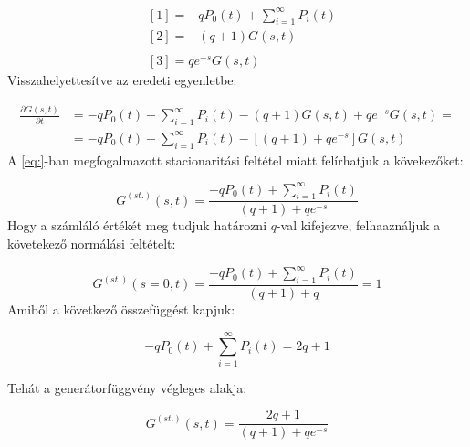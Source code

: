 \begin{align}
    &[1] = - q P_{0} \left( t \right)
    +
    \sum_{i=1}^{\infty} P_{i} \left( t \right)
    \\
    &[2] = - \left( q + 1 \right) G \left( s, t \right)
    \\ \nonumber \\
    &[3] = q e^{-s} G \left( s, t \right)
\end{align}
Visszahelyettesítve az eredeti egyenletbe:

\begin{align}
    \frac{\partial G \left( s, t \right)}{\partial t}
    &=
    - q P_{0} \left( t \right)
    +
    \sum_{i=1}^{\infty} P_{i} \left( t \right)
    -
    \left( q + 1 \right) G \left( s, t \right)
    +
    q e^{-s} G \left( s, t \right)
    = \nonumber \\
    &=
    - q P_{0} \left( t \right)
    +
    \sum_{i=1}^{\infty} P_{i} \left( t \right)
    -
    \left[ \left( q + 1 \right)
    +
    q e^{-s} \right] G \left( s, t \right)
\end{align}
A \ref{eq:}-ban megfogalmazott stacionaritási feltétel miatt felírhatjuk a kövekezőket:

\begin{equation}
    G^{\left( st. \right)} \left( s, t \right)
    =
    \frac{- q P_{0} \left( t \right)
    +
    \sum_{i=1}^{\infty} P_{i} \left( t \right)}
    {\left( q + 1 \right)
    +
    q e^{-s}}
\end{equation}
Hogy a számláló értékét meg tudjuk határozni $q$-val kifejezve, felhaaználjuk a követekező normálási feltételt:

\begin{equation}
    G^{\left( st. \right)} \left( s = 0, t \right)
    =
    \frac{- q P_{0} \left( t \right)
    +
    \sum_{i=1}^{\infty} P_{i} \left( t \right)}
    {\left( q + 1 \right)
    +
    q}
    =
    1
\end{equation}
Amiből a következő összefüggést kapjuk:

\begin{equation}
    - q P_{0} \left( t \right)
    +
    \sum_{i=1}^{\infty} P_{i} \left( t \right)
    =
    2q + 1
\end{equation}

Tehát a generátorfüggvény végleges alakja:

\begin{equation}
    G^{\left( st. \right)} \left( s, t \right)
    =
    \frac{2q + 1}
    {\left( q + 1 \right)
    +
    q e^{-s}}
\end{equation}

